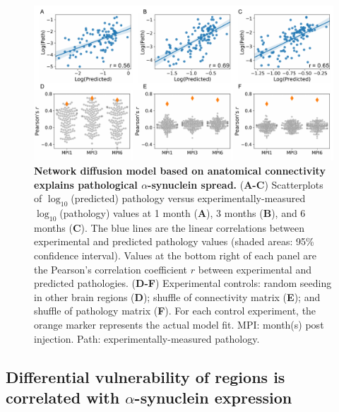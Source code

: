 \begin{figure}[!h]
  \includegraphics[width = \linewidth]{Figures/Fig1.pdf}
  
    \caption{
      \textbf{Network diffusion model based on anatomical connectivity explains pathological $\alpha$-synuclein spread.}
       (\textbf{A-C}) Scatterplots of $\log_{10}$(predicted) pathology versus experimentally-measured $\log_{10}$(pathology) values at 1 month (\textbf{A}), 3 months (\textbf{B}), and 6 months (\textbf{C}). The blue lines are the linear correlations between experimental and predicted pathology values (shaded areas: 95\% confidence interval). Values at the bottom right of each panel are the Pearson's correlation coefficient $r$ between experimental and predicted pathologies.
      (\textbf{D-F}) Experimental controls: random seeding in other brain regions (\textbf{D}); shuffle of connectivity matrix (\textbf{E}); and shuffle of pathology matrix (\textbf{F}). For each control experiment, the orange marker represents the actual model fit. MPI: month(s) post injection. Path: experimentally-measured pathology.}
  
\end{figure}
    
\subsection{Differential vulnerability of regions is correlated with $\alpha$-synuclein expression}

